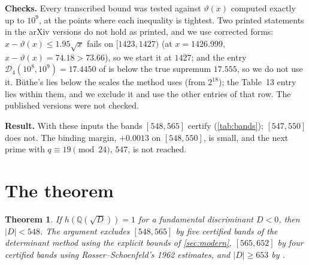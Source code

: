 \documentclass[11pt]{article}
\newtheorem{theorem}{Theorem}[section]
\theoremstyle{definition}
\newcommand{\Q}{\mathbb{Q}}
\begin{document}
\textbf{Checks.} Every transcribed bound was tested against $\vartheta(x)$ computed exactly up to $10^9$, at the points where each inequality is tightest. Two printed statements in the arXiv versions do not hold as printed, and we use corrected forms: $x - \vartheta(x) \le 1.95\sqrt x$ fails on $[1423, 1427)$ (at $x = 1426.999$, $x - \vartheta(x) = 74.18 > 73.66$), so we start it at $1427$; and the entry $\mathcal D_4(10^8, 10^9) = 17.4450$ of \cite[Table~13]{BKLNW} is below the true supremum $17.555$, so we do not use it. B\"uthe's lies below the scales the method uses (from $2^{18}$); the Table~13 entry lies within them, and we exclude it and use the other entries of that row. The published versions were not checked.

\textbf{Result.} With these inputs the bands $[548, 565]$ certify (\cref{tab:bands}); $[547, 550]$ does not. The binding margin, $+0.0013$ on $[548, 550]$, is small, and the next prime with $q \equiv 19 \pmod{24}$, $547$, is not reached.

\section{The theorem}\label{sec:theorem}
\begin{theorem}\label{thm:main}
If $h(\Q(\sqrt D)) = 1$ for a fundamental discriminant $D<0$, then $|D| < 548$. The argument excludes $[548, 565]$ by five certified bands of the determinant method using the explicit bounds of \cref{sec:modern}, $[565, 652]$ by four certified bands using Rosser--Schoenfeld's 1962 estimates, and $|D| \ge 653$ by \cite{CN1paper}.
\end{theorem}
\end{document}
